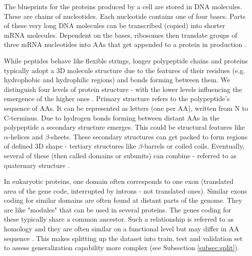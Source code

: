 \documentclass[msc,deptreport,ai]{infthesis} %
\begin{document}
		The blueprints for the proteins produced by a cell are stored in \gls{DNA} molecules. These are chains of nucleotides. Each nucleotide contains one of four bases. Parts of these very long \gls{DNA} molecules can be transcribed (copied) into shorter \gls{mRNA} molecules. Dependent on the bases, ribosomes then translate groups of three \gls{mRNA} nucleotides into \glspl{AA} that get appended to a protein in production \cite{pollard_cell_2016}.
	
		While peptides behave like flexible strings, longer polypeptide chains and proteins typically adopt a 3D molecule structure due to the features of their residues (e.g. hydrophobic and hydrophilic regions) and bonds forming between them. We distinguish four levels of protein structure - with the lower levels influencing the emergence of the higher ones \cite{crowe_chemistry_2014}. Primary structure refers to the polypeptide's sequence of \glspl{AA}. It can be represented as letters (one per \gls{AA}), written from N to C-terminus. Due to hydrogen bonds forming between distant \glspl{AA} in the polypeptide a secondary structure emerges. This could be structural features like $\alpha$-helices and $\beta$-sheets. These secondary structures can get packed to form regions of defined 3D shape - tertiary structures like $\beta$-barrels or coiled coils. Eventually, several of these (then called domains or subunits) can combine - referred to as quaternary structure \cite{crowe_chemistry_2014}.
	
		In eukaryotic proteins, one domain often corresponds to one exon (translated area of the gene code, interrupted by introns - not translated ones). Similar exons coding for similar domains are often found at distant parts of the genome. They are like "modules" that can be used in several proteins. The genes coding for these typically share a common ancestor. Such a relationship is referred to as homology and they are often similar on a functional level but may differ in \gls{AA} sequence \cite[Chapter 3]{pollard_cell_2016}. This makes splitting up the dataset into train, test and validation set to assess generalization capability more complex (see Subsection \ref{subsec:split}).
	
\end{document}
